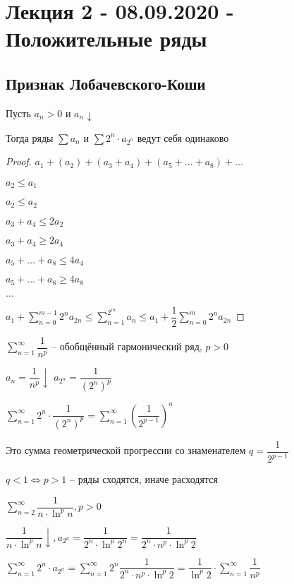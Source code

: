\section{Лекция 2 - 08.09.2020 - Положительные ряды}
\subsection{Признак Лобачевского-Коши}
\begin{proposal}
    Пусть $a_n > 0$ и $a_n \downarrow$

    Тогда ряды $\sum a_n$ и $\sum 2^n \cdot a_{2^n}$ ведут себя одинаково
\end{proposal}
\begin{proof}
    $a_1 + (a_2) + (a_3 + a_4) + (a_5 + \dots + a_8) + \dots$

    $a_2 \leq a_1$
    
    $a_2 \leq a_2$

    
    $a_3 + a_4 \leq 2a_2$
    
    $a_3 + a_4 \geq 2a_4$

    $a_5 + \dots + a_8 \leq 4a_4$

    $a_5 + \dots + a_8 \geq 4a_8$


    $\dots$

    $a_1 + \sum_{n=0}^{m - 1} 2^n a_{2n} \leq \sum_{n = 1}^{2^m} a_n \leq a_1 + \dfrac{1}{2} \sum_{n=0}^{m} 2^n a_{2n}$

\end{proof}

\begin{example}
    $\sum_{n=1}^{\infty} \dfrac{1}{n^p}$ -- обобщённый гармонический ряд, $p>0$

    $a_n = \dfrac{1}{n^p} \downarrow$
    $a_{2^n} = \dfrac{1}{(2^n)^p}$

    $\sum_{n=1}^{\infty} 2^n \cdot \dfrac{1}{(2^n)^p} = \sum_{n=1}^{\infty} \left(\dfrac{1}{2^{p - 1}}\right)^n$

    Это сумма геометрической прогрессии со знаменателем $q = \dfrac{1}{2^{p - 1}}$

    $q < 1 \iff p > 1$ -- ряды сходятся, иначе расходятся
\end{example}

\begin{example}
    $\sum_{n=2}^{\infty} \dfrac{1}{n \cdot \ln^p{n}}, p > 0$

    $\dfrac{1}{n \cdot \ln^p{n}} \downarrow, a_{2^n} = \dfrac{1}{2^n \cdot \ln^p{2^n}} = \dfrac{1}{2^n \cdot n^p \cdot \ln^p{2}}$

    $\sum_{n=1}^{\infty} 2^n \cdot a_{2^n} = \sum_{n=1}^{\infty} 2^n \dfrac{1}{2^n \cdot n^p \cdot \ln^p{2}} = \dfrac{1}{\ln^p 2} \cdot \sum_{n=1}^{\infty} \dfrac{1}{n^p}$
\end{example}

